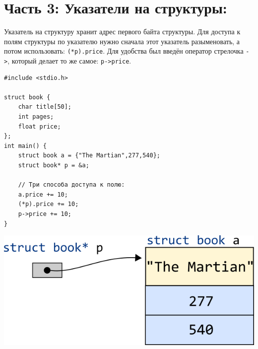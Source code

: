 \documentclass{article}
\begin{document}
\section*{Часть 3: Указатели на структуры:}
Указатель на структуру хранит адрес первого байта структуры. Для доступа к полям структуры по указателю нужно сначала этот указатель разыменовать, а потом использовать: \texttt{(*p).price}. Для удобства был введён оператор стрелочка \texttt{->}, который делает то же самое: \texttt{p->price}.
\begin{multicols}{2}
\begin{lstlisting}
#include <stdio.h>

struct book {
    char title[50];
    int pages;
    float price;
};
int main() {
    struct book a = {"The Martian",277,540};
    struct book* p = &a;
    
    // Три способа доступа к полю:
    a.price += 10;
    (*p).price += 10;
    p->price += 10;
}
\end{lstlisting}

\vfill\null
\columnbreak

\vspace*{3\baselineskip}
\begin{center}
\includegraphics[scale=0.5]{../images/structpointer2.png}
\end{center}
\end{multicols}
\end{document}
